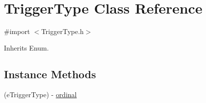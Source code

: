 \hypertarget{interface_trigger_type}{}\section{Trigger\+Type Class Reference}
\label{interface_trigger_type}


{\ttfamily \#import $<$Trigger\+Type.\+h$>$}



Inherits Enum.

\subsection*{Instance Methods}
\begin{DoxyCompactItemize}
\item 
(e\+Trigger\+Type) -\/ \hyperlink{interface_trigger_type_aaba2a5cd72b2780e8ef765039a37b5c2}{ordinal}
\end{DoxyCompactItemize}
